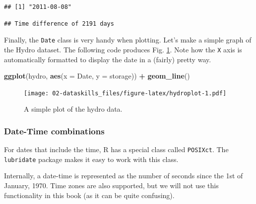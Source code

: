\documentclass[]{book}
\newenvironment{Shaded}{\begin{snugshade}}{\end{snugshade}}
\newcommand{\CommentTok}[1]{\textcolor[rgb]{0.56,0.35,0.01}{\textit{#1}}}
\newcommand{\DataTypeTok}[1]{\textcolor[rgb]{0.13,0.29,0.53}{#1}}
\newcommand{\KeywordTok}[1]{\textcolor[rgb]{0.13,0.29,0.53}{\textbf{#1}}}
\newcommand{\NormalTok}[1]{#1}
\newcommand{\OperatorTok}[1]{\textcolor[rgb]{0.81,0.36,0.00}{\textbf{#1}}}
\newcommand{\StringTok}[1]{\textcolor[rgb]{0.31,0.60,0.02}{#1}}
\begin{document}
\begin{verbatim}
## [1] "2011-08-08"
\end{verbatim}

\begin{Shaded}
\end{Shaded}

\begin{verbatim}
## Time difference of 2191 days
\end{verbatim}

Finally, the \texttt{Date} class is very handy when plotting. Let's make a simple graph of the Hydro dataset. The following code produces Fig. \ref{fig:hydroplot}. Note how the \texttt{X} axis is automatically formatted to display the date in a (fairly) pretty way.

\begin{Shaded}
\begin{Highlighting}[]
\KeywordTok{ggplot}\NormalTok{(hydro, }\KeywordTok{aes}\NormalTok{(}\DataTypeTok{x =}\NormalTok{ Date, }\DataTypeTok{y =}\NormalTok{ storage)) }\OperatorTok{+}
\StringTok{  }\KeywordTok{geom_line}\NormalTok{()}
\end{Highlighting}
\end{Shaded}

\begin{figure}
\centering
\texttt{[image: 02-dataskills\_files/figure-latex/hydroplot-1.pdf]}
\caption{\label{fig:hydroplot}A simple plot of the hydro data.}
\end{figure}

\hypertarget{datetime}{%
\subsubsection{Date-Time combinations}\label{datetime}}

For dates that include the time, R has a special class called \texttt{POSIXct}. The \texttt{lubridate} package makes it easy to work with this class.

Internally, a date-time is represented as the number of seconds since the 1st of January, 1970. Time zones are also supported, but we will not use this functionality in this book (as it can be quite confusing).
\end{document}
